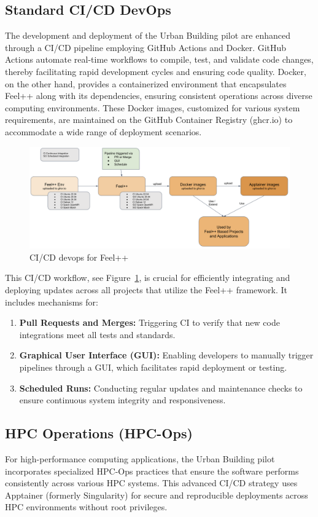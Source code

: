 \documentclass[runningheads]{llncs}
\begin{document}
\subsection{Standard CI/CD DevOps}
The development and deployment of the Urban Building pilot are enhanced through a CI/CD pipeline employing GitHub Actions and Docker. GitHub Actions automate real-time workflows to compile, test, and validate code changes, thereby facilitating rapid development cycles and ensuring code quality. Docker, on the other hand, provides a containerized environment that encapsulates Feel++ along with its dependencies, ensuring consistent operations across diverse computing environments. These Docker images, customized for various system requirements, are maintained on the GitHub Container Registry (ghcr.io) to accommodate a wide range of deployment scenarios.

\begin{figure}
    \centering
    \includegraphics[width=\textwidth]{images/feelpp-devops.png}
    \caption{CI/CD devops for Feel++}
    \label{fig:feelpp-devops}
\end{figure}
This CI/CD workflow, see Figure~\ref{fig:feelpp-devops}, is crucial for efficiently integrating and deploying updates across all projects that utilize the Feel++ framework. It includes mechanisms for:
\begin{enumerate}
    \item \textbf{Pull Requests and Merges:} Triggering CI to verify that new code integrations meet all tests and standards.
    \item \textbf{Graphical User Interface (GUI):} Enabling developers to manually trigger pipelines through a GUI, which facilitates rapid deployment or testing.
    \item \textbf{Scheduled Runs:} Conducting regular updates and maintenance checks to ensure continuous system integrity and responsiveness.
\end{enumerate}

\subsection{HPC Operations (HPC-Ops)}
For high-performance computing applications, the Urban Building pilot incorporates specialized HPC-Ops practices that ensure the software performs consistently across various HPC systems. This advanced CI/CD strategy uses Apptainer (formerly Singularity) for secure and reproducible deployments across HPC environments without root privileges.
\end{document}
